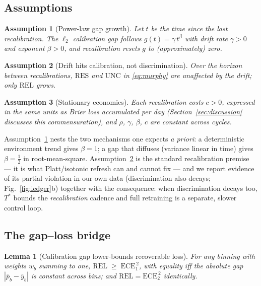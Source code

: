 \documentclass[conference]{IEEEtran}
\newtheorem{lemma}{Lemma}
\newtheorem{assumption}{Assumption}
\begin{document}
\subsection{Assumptions}

\begin{assumption}[Power-law gap growth]
\label{ass:drift}
Let $t$ be the time since the last recalibration. The $\ell_2$ calibration
gap follows $g(t)=\gamma\,t^{\beta}$ with drift rate $\gamma>0$ and exponent
$\beta>0$, and recalibration resets $g$ to (approximately) zero.
\end{assumption}

\begin{assumption}[Drift hits calibration, not discrimination]
\label{ass:res}
Over the horizon between recalibrations, $\mathrm{RES}$ and $\mathrm{UNC}$ in
\eqref{eq:murphy} are unaffected by the drift; only $\mathrm{REL}$ grows.
\end{assumption}

\begin{assumption}[Stationary economics]
\label{ass:cost}
Each recalibration costs $c>0$, expressed in the same units as Brier loss
accumulated per day (Section~\ref{sec:discussion} discusses this
commensuration), and $\rho$, $\gamma$, $\beta$, $c$ are constant across
cycles.
\end{assumption}

Assumption~\ref{ass:drift} nests the two mechanisms one expects \emph{a
priori}: a deterministic environment trend gives $\beta=1$; a gap that
diffuses (variance linear in time) gives $\beta=\tfrac12$ in root-mean-square.
Assumption~\ref{ass:res} is the standard recalibration premise --- it is what
Platt/isotonic refresh can and cannot fix --- and we report evidence of its
partial violation in our own data (discrimination also decays;
Fig.~\ref{fig:ledger}b) together with the consequence: when discrimination
decays too, $T^{*}$ bounds the \emph{recalibration} cadence and full
retraining is a separate, slower control loop.

\subsection{The gap--loss bridge}

\begin{lemma}[Calibration gap lower-bounds recoverable loss]
\label{lem:bridge}
For any binning with weights $w_b$ summing to one,
$\mathrm{REL}\;\ge\;\mathrm{ECE}_1^{\,2}$, with equality iff the absolute gap
$|\bar p_b-\bar y_b|$ is constant across bins; and
$\mathrm{REL}=\mathrm{ECE}_2^{\,2}$ identically.
\end{lemma}
\end{document}
